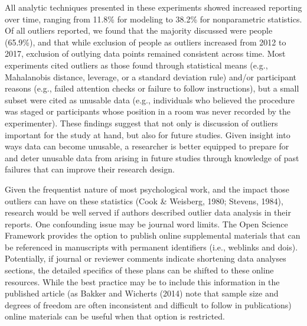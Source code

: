 \documentclass[english,man]{apa6}
\theoremstyle{definition}
\theoremstyle{definition}
\theoremstyle{definition}
\theoremstyle{remark}
\begin{document}
All analytic techniques presented in these experiments showed increased
reporting over time, ranging from 11.8\% for modeling to 38.2\% for
nonparametric statistics. Of all outliers reported, we found that the
majority discussed were people (65.9\%), and that while exclusion of
people as outliers increased from 2012 to 2017, exclusion of outlying
data points remained consistent across time. Most experiments cited
outliers as those found through statistical means (e.g., Mahalanobis
distance, leverage, or a standard deviation rule) and/or participant
reasons (e.g., failed attention checks or failure to follow
instructions), but a small subset were cited as unusable data (e.g.,
individuals who believed the procedure was staged or participants whose
position in a room was never recorded by the experimenter). These
findings suggest that not only is discussion of outliers important for
the study at hand, but also for future studies. Given insight into ways
data can become unusable, a researcher is better equipped to prepare for
and deter unusable data from arising in future studies through knowledge
of past failures that can improve their research design.

Given the frequentist nature of most psychological work, and the impact
those outliers can have on these statistics (Cook \& Weisberg, 1980;
Stevens, 1984), research would be well served if authors described
outlier data analysis in their reports. One confounding issue may be
journal word limits. The Open Science Framework provides the option to
publish online supplemental materials that can be referenced in
manuscripts with permanent identifiers (i.e., weblinks and dois).
Potentially, if journal or reviewer comments indicate shortening data
analyses sections, the detailed specifics of these plans can be shifted
to these online resources. While the best practice may be to include
this information in the published article (as Bakker and Wicherts (2014)
note that sample size and degrees of freedom are often inconsistent and
difficult to follow in publications) online materials can be useful when
that option is restricted.
\end{document}
